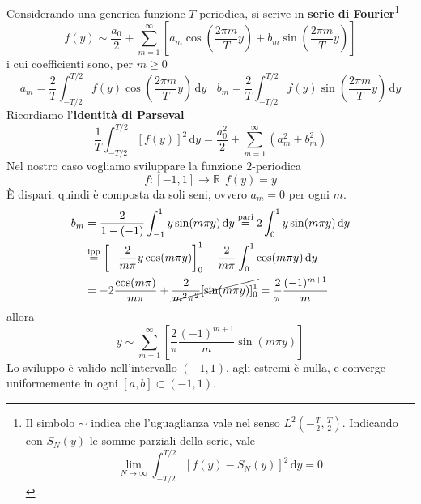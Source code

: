 \documentclass[10pt,a4paper,twoside,openright]{book}
\newcommand{\de}{\,\mathrm d}
\newcommand{\dy}{\de y}
\begin{document}
Considerando una generica funzione $T$-periodica, si scrive in \textbf{serie di Fourier}\footnote{Il simbolo $\sim $ indica che l'uguaglianza vale nel senso $L^{2}\left(-\frac{T}{2},\frac{T}{2}\right)$. Indicando con $S_{N}(y)$ le somme parziali della serie, vale
    \begin{equation*}
        \lim _{N\rightarrow \infty }\int ^{T/2}_{-T/2}[ f(y) -S_{N}(y)]^{2} \dy=0
    \end{equation*}}
\begin{equation*}
    f(y) \sim \frac{a_{0}}{2} +\sum\limits ^{\infty }_{m=1}\left[ a_{m}\cos\left(\frac{2\pi m}{T} y\right) +b_{m}\sin\left(\frac{2\pi m}{T} y\right)\right]
\end{equation*}
i cui coefficienti sono, per $m\geqslant 0$
\begin{equation*}
    a_{m} =\frac{2}{T}\int ^{T/2}_{-T/2} f(y)\cos\left(\frac{2\pi m}{T} y\right) \dy\ \ \ \ b_{m} =\frac{2}{T}\int ^{T/2}_{-T/2} f(y)\sin\left(\frac{2\pi m}{T} y\right) \dy
\end{equation*}
Ricordiamo l'\textbf{identità di Parseval}
\begin{equation*}
    \frac{1}{T}\int ^{T/2}_{-T/2}[ f(y)]^{2} \dy=\frac{a^{2}_{0}}{2} +\sum\limits ^{\infty }_{m=1}\left(a^{2}_{m} +b^{2}_{m}\right)
\end{equation*}
Nel nostro caso vogliamo sviluppare la funzione $2$-periodica
\begin{equation*}
    f:[ -1,1]\rightarrow \mathbb{R} \ \ f(y) =y
\end{equation*}
È dispari, quindi è composta da soli seni, ovvero $a_{m}=0$ per ogni $m$.
\begin{align*}
    b_{m} & = \frac{2}{1-(-1)}\int ^{1}_{-1} y\sin(m\pi y) \dy \overset{\text{pari}}{=}2\int ^{1}_{0} y\sin(m\pi y) \dy               \\
          & \overset{\text{ipp}}{=}\left[ -\frac{2}{m\pi } y\cos(m\pi y)\right]^{1}_{0} +\frac{2}{m\pi }\int ^{1}_{0}\cos(m\pi y) \dy \\
          & =-2\frac{\cos(m\pi)}{m\pi } +\cancel{\frac{2}{m^{2} \pi ^{2}}[\sin(m\pi y)]^{1}_{0}} =\frac{2}{\pi }\frac{(-1)^{m+1}}{m}
\end{align*}
allora
\begin{equation}
    y\sim \sum\limits ^{\infty }_{m=1}\left[\frac{2}{\pi }\frac{(-1)^{m+1}}{m}\sin(m\pi y)\right]
    \label{eq:diff-y-fourier}
\end{equation}
Lo sviluppo è valido nell'intervallo $(-1,1)$, agli estremi è nulla, e converge uniformemente in ogni $[ a,b] \subset (-1,1)$.
\end{document}
